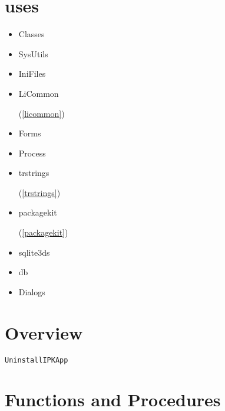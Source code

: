 \documentclass{report}
\newif\ifpdf
\begin{document}
\section{uses}
\begin{itemize}
\item \begin{ttfamily}Classes\end{ttfamily}\item \begin{ttfamily}SysUtils\end{ttfamily}\item \begin{ttfamily}IniFiles\end{ttfamily}\item \begin{ttfamily}LiCommon\end{ttfamily}(\ref{licommon})\item \begin{ttfamily}Forms\end{ttfamily}\item \begin{ttfamily}Process\end{ttfamily}\item \begin{ttfamily}trstrings\end{ttfamily}(\ref{trstrings})\item \begin{ttfamily}packagekit\end{ttfamily}(\ref{packagekit})\item \begin{ttfamily}sqlite3ds\end{ttfamily}\item \begin{ttfamily}db\end{ttfamily}\item \begin{ttfamily}Dialogs\end{ttfamily}\end{itemize}
\section{Overview}
\begin{description}
\item[\texttt{UninstallIPKApp}]
\end{description}
\section{Functions and Procedures}
\ifpdf
\end{document}
